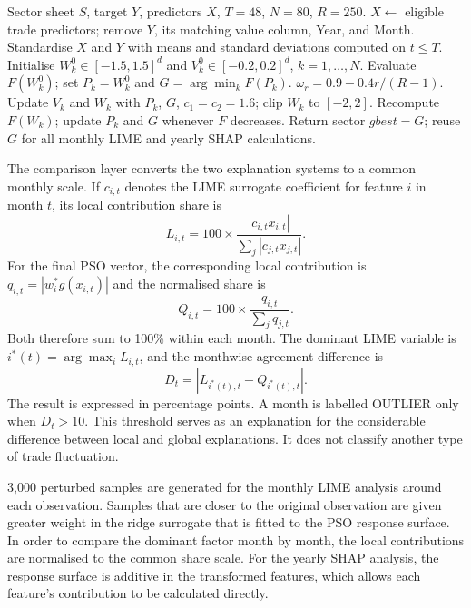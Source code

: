 \documentclass[pdftex,sn-mathphys-num]{sn-jnl}
\begin{document}
\begin{algorithm}[t]
\caption{Dataset-specific PSO algorithm}
\label{alg:pso}
\begin{algorithmic}[1]
\Require Sector sheet $S$, target $Y$, predictors $X$, $T=48$, $N=80$, $R=250$.
\State $X\leftarrow$ eligible trade predictors; remove $Y$, its matching value column, Year, and Month.
\State Standardise $X$ and $Y$ with means and standard deviations computed on $t\leq T$.
\State Initialise $W_k^0\in[-1.5,1.5]^d$ and $V_k^0\in[-0.2,0.2]^d$, $k=1,\ldots,N$.
\State Evaluate $F(W_k^0)$; set $P_k=W_k^0$ and $G=\arg\min_k F(P_k)$.
  \State $\omega_r=0.9-0.4r/(R-1)$.
  \State Update $V_k$ and $W_k$ with $P_k$, $G$, $c_1=c_2=1.6$; clip $W_k$ to $[-2,2]$.
  \State Recompute $F(W_k)$; update $P_k$ and $G$ whenever $F$ decreases.
\EndFor
\State Return sector $gbest=G$; reuse $G$ for all monthly LIME and yearly SHAP calculations.
\end{algorithmic}
\end{algorithm}

The comparison layer converts the two explanation systems to a common monthly scale. If $c_{i,t}$ denotes the LIME surrogate coefficient for feature $i$ in month $t$, its local contribution share is
\begin{equation}
L_{i,t}=100\times\frac{|c_{i,t}x_{i,t}|}{\sum_j|c_{j,t}x_{j,t}|}.
\end{equation}
For the final PSO vector, the corresponding local contribution is $q_{i,t}=|w_i^*g(x_{i,t})|$ and the normalised share is
\begin{equation}
Q_{i,t}=100\times\frac{q_{i,t}}{\sum_jq_{j,t}}.
\end{equation}
Both therefore sum to 100\% within each month. The dominant LIME variable is $i^*(t)=\arg\max_i L_{i,t}$, and the monthwise agreement difference is
\begin{equation}
D_t=|L_{i^*(t),t}-Q_{i^*(t),t}|.
\end{equation}
The result is expressed in percentage points. A month is labelled OUTLIER only when $D_t>10$. This threshold serves as an explanation for the considerable difference between local and global explanations. It does not classify another type of trade fluctuation.


3,000 perturbed samples are generated for the monthly LIME analysis around each observation. Samples that are closer to the original observation are given greater weight in the ridge surrogate that is fitted to the PSO response surface. In order to compare the dominant factor month by month, the local contributions are normalised to the common share scale. For the yearly SHAP analysis, the response surface is additive in the transformed features, which allows each feature's contribution to be calculated directly.
\end{document}
